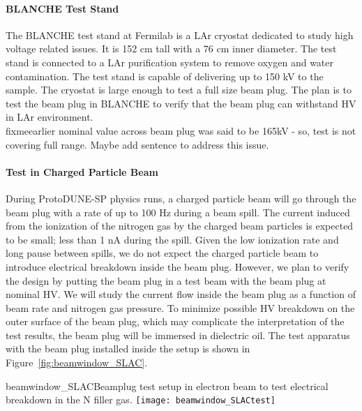 \paragraph{BLANCHE Test Stand}
The BLANCHE test stand at Fermilab is a LAr cryostat dedicated to study high voltage related issues. It is 152 cm tall with a 76 cm inner diameter. The test stand is connected to a LAr purification system to remove oxygen and water contamination. The test stand is capable of delivering up to 150 kV to the sample. The cryostat is large enough to test a full size beam plug. The plan is to test the beam plug in BLANCHE to verify that the beam plug can withstand HV in LAr environment.
\\fixme{earlier nominal value across beam plug was said to be 165kV - so, test is not covering full range. Maybe add sentence to address this issue.}

\paragraph{Test in Charged Particle Beam}
During ProtoDUNE-SP physics runs, a charged particle beam will go through the beam plug with a rate of up to 100 Hz during a beam spill. The current induced from the ionization of the nitrogen gas by the charged beam particles is expected to be small; less than 1 nA during the spill. Given the low ionization rate and long pause between spills, we do not expect the charged particle beam to introduce electrical breakdown inside the beam plug. However, we plan to verify the design by putting the beam plug in a test beam with the beam plug at nominal HV. We will study the current flow inside the beam plug as a function of beam rate and nitrogen gas pressure. To minimize possible HV breakdown on the outer surface of the beam plug, which may complicate the interpretation of the test results, the beam plug will be immersed in dielectric oil. The test apparatus with the beam plug installed inside the setup is shown in Figure~\ref{fig:beamwindow_SLAC}.
\begin{cdrfigure}{beamwindow_SLAC}{Beamplug test setup in electron beam to test electrical breakdown in the N filler gas.}
  \texttt{[image: beamwindow\_SLACtest]}
\end{cdrfigure}

